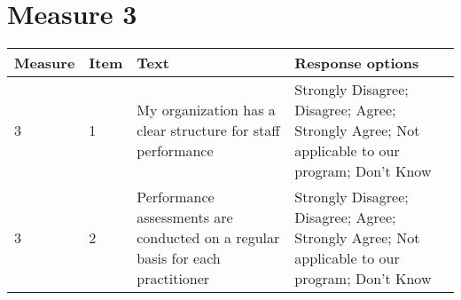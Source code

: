 \documentclass[]{article}
\begin{document}
\section{Measure 3}\label{measure-3}

\begin{longtable}[]{@{}llll@{}}
\toprule
\begin{minipage}[b]{0.05\columnwidth}\raggedright\strut
Measure\strut
\end{minipage} & \begin{minipage}[b]{0.04\columnwidth}\raggedright\strut
Item\strut
\end{minipage} & \begin{minipage}[b]{0.40\columnwidth}\raggedright\strut
Text\strut
\end{minipage} & \begin{minipage}[b]{0.40\columnwidth}\raggedright\strut
Response options\strut
\end{minipage}\tabularnewline
\midrule
\endhead
\begin{minipage}[t]{0.05\columnwidth}\raggedright\strut
3\strut
\end{minipage} & \begin{minipage}[t]{0.04\columnwidth}\raggedright\strut
1\strut
\end{minipage} & \begin{minipage}[t]{0.40\columnwidth}\raggedright\strut
My organization has a clear structure for staff performance\strut
\end{minipage} & \begin{minipage}[t]{0.40\columnwidth}\raggedright\strut
Strongly Disagree; Disagree; Agree; Strongly Agree; Not applicable to
our program; Don't Know\strut
\end{minipage}\tabularnewline
\begin{minipage}[t]{0.05\columnwidth}\raggedright\strut
3\strut
\end{minipage} & \begin{minipage}[t]{0.04\columnwidth}\raggedright\strut
2\strut
\end{minipage} & \begin{minipage}[t]{0.40\columnwidth}\raggedright\strut
Performance assessments are conducted on a regular basis for each
practitioner\strut
\end{minipage} & \begin{minipage}[t]{0.40\columnwidth}\raggedright\strut
Strongly Disagree; Disagree; Agree; Strongly Agree; Not applicable to
our program; Don't Know\strut
\end{minipage}\tabularnewline

\end{longtable}
\end{document}
